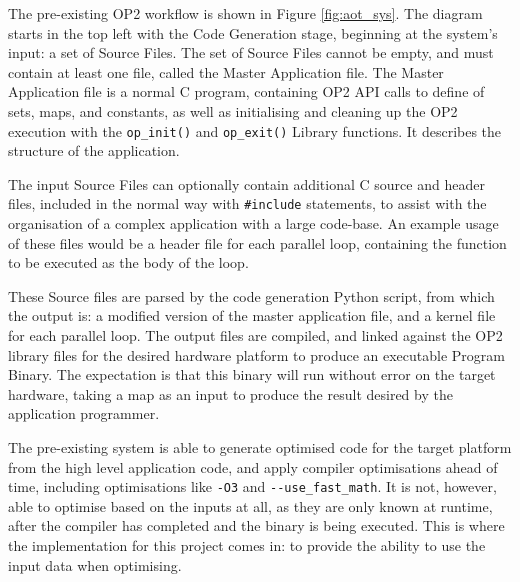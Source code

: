 The pre-existing OP2 workflow is shown in Figure \ref{fig:aot_sys}. The diagram starts in the top left with the Code Generation stage, beginning at the system's input: a set of Source Files. The set of Source Files cannot be empty, and must contain at least one file, called the Master Application file. The Master Application file is a normal C program, containing OP2 API calls to define of sets, maps, and constants, as well as initialising and cleaning up the OP2 execution with the \verb|op_init()| and \verb|op_exit()| Library functions. It describes the structure of the application.
\par
The input Source Files can optionally contain additional C source and header files, included in the normal way with \verb|#include| statements, to assist with the organisation of a complex application with a large code-base. An example usage of these files would be a header file for each parallel loop, containing the function to be executed as the body of the loop.
\par
These Source files are parsed by the code generation Python script, from which the output is: a modified version of the master application file, and a kernel file for each parallel loop. The output files are compiled, and linked against the OP2 library files for the desired hardware platform to produce an executable Program Binary. The expectation is that this binary will run without error on the target hardware, taking a map as an input to produce the result desired by the application programmer.
\par
The pre-existing system is able to generate optimised code for the target platform from the high level application code, and apply compiler optimisations ahead of time, including optimisations like \verb|-O3| and \verb|--use_fast_math|. It is not, however, able to optimise based on the inputs at all, as they are only known at runtime, after the compiler has completed and the binary is being executed. This is where the implementation for this project comes in: to provide the ability to use the input data when optimising.

